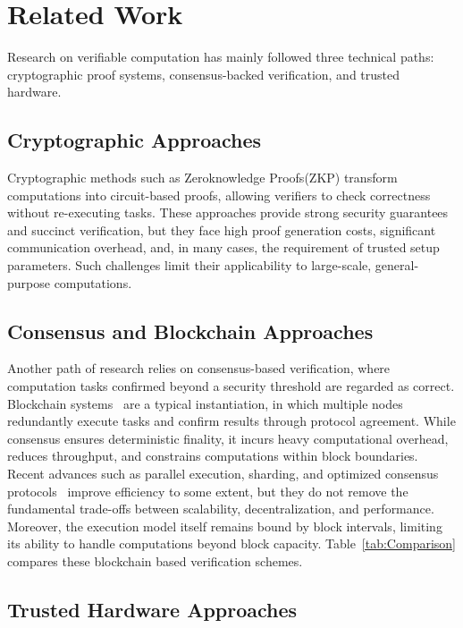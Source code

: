 \documentclass[3p]{elsarticle}
\theoremstyle{remark}
\begin{document}
\section{Related Work}

Research on verifiable computation has mainly followed three technical paths: cryptographic proof systems, consensus-backed verification, and trusted hardware.

\subsection{Cryptographic Approaches}

Cryptographic methods such as Zeroknowledge Proofs(ZKP)\cite{NOVA,antman,zhang2021pipezk,transparentZK,Orion} transform computations into circuit-based proofs, allowing verifiers to check correctness without re-executing tasks. These approaches provide strong security guarantees and succinct verification, but they face high proof generation costs, significant communication overhead, and, in many cases, the requirement of trusted setup parameters. Such challenges limit their applicability to large-scale, general-purpose computations.

\subsection{Consensus and Blockchain Approaches}

Another path of research relies on consensus-based verification, where computation tasks confirmed beyond a security threshold are regarded as correct. Blockchain systems~\cite{wood2014ethereum} are a typical instantiation, in which multiple nodes redundantly execute tasks and confirm results through protocol agreement. While consensus ensures deterministic finality, it incurs heavy computational overhead, reduces throughput, and constrains computations within block boundaries. Recent advances such as parallel execution, sharding, and optimized consensus protocols~\cite{ICP,solana-doc,shardingsurvey} improve efficiency to some extent, but they do not remove the fundamental trade-offs between scalability, decentralization, and performance. Moreover, the execution model itself remains bound by block intervals, limiting its ability to handle computations beyond block capacity.
Table~\ref{tab:Comparison} compares these blockchain based verification schemes.

\subsection{Trusted Hardware Approaches}
\end{document}
